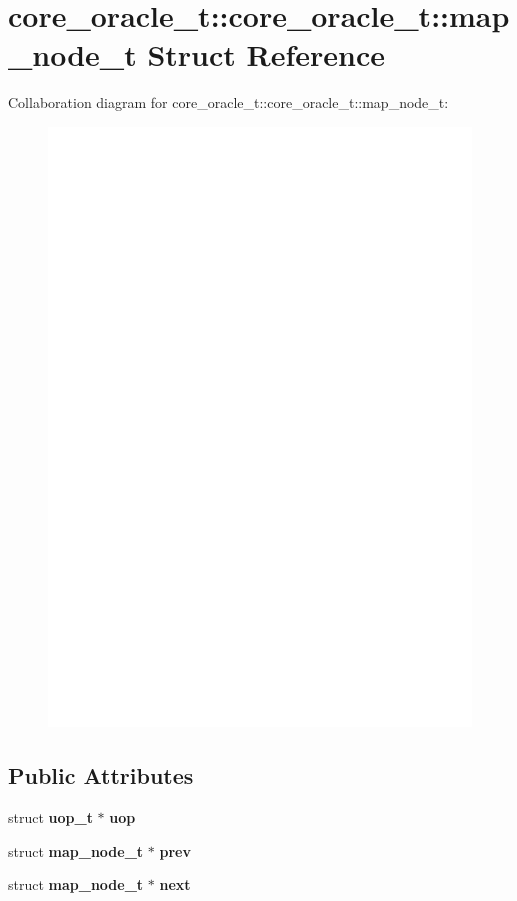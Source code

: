 \section{core\_\-oracle\_\-t::core\_\-oracle\_\-t::map\_\-node\_\-t Struct Reference}
\label{structcore__oracle__t_1_1map__node__t}
Collaboration diagram for core\_\-oracle\_\-t::core\_\-oracle\_\-t::map\_\-node\_\-t:\nopagebreak
\begin{figure}[H]
\begin{center}
\leavevmode
\includegraphics[width=400pt]{structcore__oracle__t_1_1map__node__t__coll__graph}
\end{center}
\end{figure}
\subsection*{Public Attributes}
\begin{CompactItemize}
\item 
struct {\bf uop\_\-t} $\ast$ {\bf uop}
\item 
struct {\bf map\_\-node\_\-t} $\ast$ {\bf prev}
\item 
struct {\bf map\_\-node\_\-t} $\ast$ {\bf next}
\end{CompactItemize}


